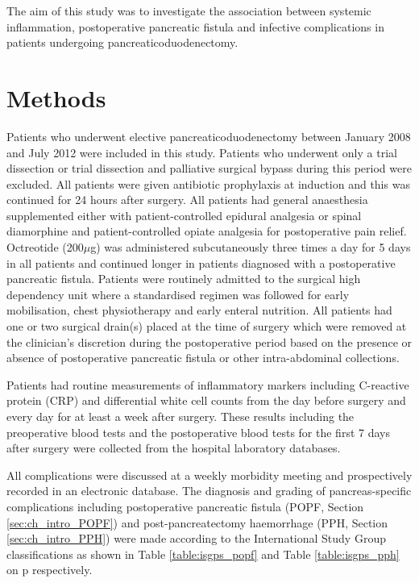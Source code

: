 The aim of this study was to investigate the association between systemic inflammation, postoperative pancreatic fistula and infective complications in patients undergoing pancreaticoduodenectomy.

\clearpage
\section{Methods}

Patients who underwent elective pancreaticoduodenectomy between January 2008 and July 2012 were included in this study. 
Patients who underwent only a trial dissection or trial dissection and palliative surgical bypass during this period were excluded. 
All patients were given antibiotic prophylaxis at induction and this was continued for 24 hours after surgery. 
All patients had general anaesthesia supplemented either with patient-controlled epidural analgesia or spinal diamorphine and patient-controlled opiate analgesia for postoperative pain relief. 
Octreotide (200$\mu$g) was administered subcutaneously three times a day for 5 days in all patients and continued longer in patients diagnosed with a postoperative pancreatic fistula. 
Patients were routinely admitted to the surgical high dependency unit where a standardised regimen was followed for early mobilisation, chest physiotherapy and early enteral nutrition. 
All patients had one or two surgical drain(s) placed at the time of surgery which were removed at the clinician's discretion during the postoperative period based on the presence or absence of postoperative pancreatic fistula or other intra-abdominal collections. 

Patients had routine measurements of inflammatory markers including C-reactive protein (CRP) and differential white cell counts from the day before surgery and every day for at least a week after surgery. 
These results including the preoperative blood tests and the postoperative blood tests for the first 7 days after surgery were collected from the hospital laboratory databases.

All complications were discussed at a weekly morbidity meeting and prospectively recorded in an electronic database.  The diagnosis and grading of pancreas-specific complications including postoperative pancreatic fistula (POPF, Section \ref{sec:ch_intro_POPF}) and post-pancreatectomy haemorrhage (PPH, Section \ref{sec:ch_intro_PPH}) were made according to the International Study Group classifications as shown in Table \ref{table:isgps_popf} and Table \ref{table:isgps_pph} on p\pageref{table:isgps_popf} respectively.

